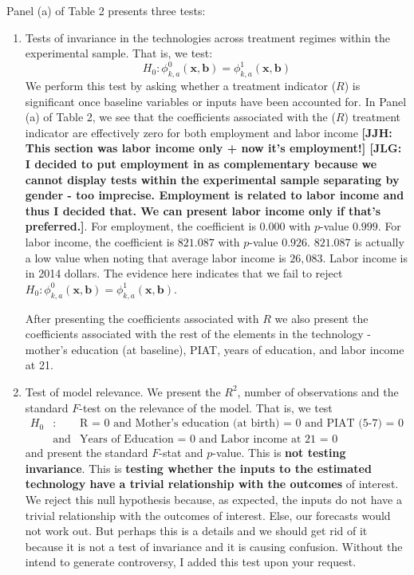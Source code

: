 \noindent Panel (a) of Table 2 presents three tests: 
\begin{enumerate}
\item Tests of invariance in the technologies across treatment regimes within the experimental sample. That is, we test:
	\begin{equation} 
	H_0: \phi_{k,a}^0 \left( \bm{x}, \bm{b} \right) = \phi_{k,a}^1 \left( \bm{x}, \bm{b} \right)  
	\end{equation}
\noindent We perform this test by asking whether a treatment indicator ($R$) is significant once baseline variables or inputs have been accounted for.  In Panel (a) of Table 2, we see that the coefficients associated with the ($R$) treatment indicator are effectively zero for both employment and labor income \textbf{[JJH: This section was labor income only + now it's employment!] [JLG: I decided to put employment in as complementary because we cannot display tests within the experimental sample separating by gender - too imprecise. Employment is related to labor income and thus I decided that. We can present labor income only if that's preferred.]}. For employment, the coefficient is $0.000$ with $p$-value $0.999$. For labor income, the coefficient is $821.087$ with $p$-value $0.926$. $821.087$ is actually a low value when noting that average labor income is $26,083$. Labor income is in 2014 dollars. The evidence here indicates that we fail to reject $H_0: \phi_{k,a}^0 \left( \bm{x}, \bm{b} \right) = \phi_{k,a}^1 \left( \bm{x}, \bm{b} \right)$. 

\noindent After presenting the coefficients associated with $R$ we also present the coefficients associated with the rest of the elements in the technology - mother's education (at baseline), PIAT, years of education, and labor income at 21.\\

\item Test of model relevance. We present the $R^2$, number of observations and the standard $F$-test on the relevance of the model. That is, we test 
	\begin{eqnarray} 
	H_0&:& \text{R = 0 and Mother's education (at birth) = 0 and PIAT (5-7) = 0} \nonumber \\ 
	      & \text{and} & \text{Years of Education = 0 and Labor income at 21 = 0}
	\end{eqnarray}
\noindent and present the standard $F$-stat and $p$-value. This is \textbf{not testing invariance}. This is \textbf{testing whether the inputs to the estimated technology have a trivial relationship with the outcomes} of interest. We reject this null hypothesis because, as expected, the inputs do not have a trivial relationship with the outcomes of interest. Else, our forecasts would not work out. But perhaps this is a details and we should get rid of it because it is not a test of invariance and it is causing confusion. Without the intend to generate controversy, I added this test upon your request.\\


\end{enumerate}
